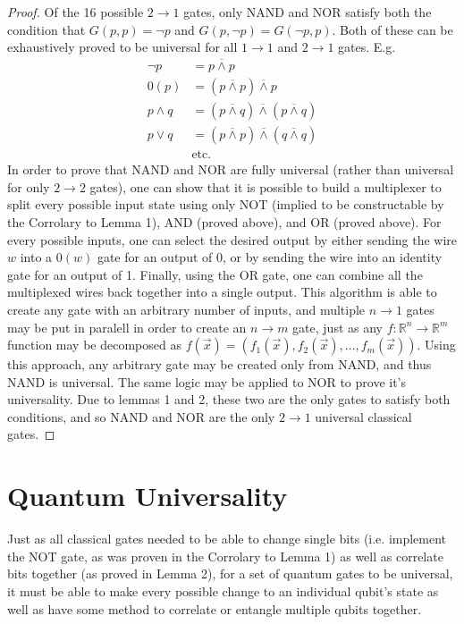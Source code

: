 \documentclass[12pt]{article}
\newcommand{\nand}{\overline{\land}}
\begin{document}
\begin{proof}
    Of the 16 possible $2 \to 1$ gates, only NAND and NOR satisfy both the condition that $G(p, p) = \neg p$ and $G(p, \neg p) = G(\neg p, p)$.
    Both of these can be exhaustively proved to be universal for all $1 \to 1$ and $2 \to 1$ gates. E.g.
    \begin{align}
        \neg p &= p \nand p \\
        0(p) &= (p \nand p) \nand p \\
        p \land q &= (p \nand q) \nand (p \nand q) \\
        p \lor q &= (p \nand p) \nand (q \nand q) \\
        &\text{etc.}
    \end{align}
    In order to prove that NAND and NOR are fully universal (rather than universal for only $2 \to 2$ gates), one can show that it is possible to build a multiplexer to split every possible input state using only NOT (implied to be constructable by the Corrolary to Lemma 1), AND (proved above), and OR (proved above). For every possible inputs, one can select the desired output by either sending the wire $w$ into a $0(w)$ gate for an output of 0, or by sending the wire into an identity gate for an output of 1. Finally, using the OR gate, one can combine all the multiplexed wires back together into a single output.
    This algorithm is able to create any gate with an arbitrary number of inputs, and multiple $n \to 1$ gates may be put in paralell in order to create an $n \to m$ gate, just as any $f: \mathbb{R}^n \to \mathbb{R}^m$ function may be decomposed as $f(\overrightarrow{x}) = (f_1(\overrightarrow{x}), f_2(\overrightarrow{x}), \dots, f_m(\overrightarrow{x}))$.
    Using this approach, any arbitrary gate may be created only from NAND, and thus NAND is universal. The same logic may be applied to NOR to prove it's universality. Due to lemmas 1 and 2, these two are the only gates to satisfy both conditions, and so NAND and NOR are the only $2 \to 1$ universal classical gates.
\end{proof}

\section{Quantum Universality}
Just as all classical gates needed to be able to change single bits (i.e. implement the NOT gate, as was proven in the Corrolary to Lemma 1) as well as correlate bits together (as proved in Lemma 2), for a set of quantum gates to be universal, it must be able to make every possible change to an individual qubit's state as well as have some method to correlate or entangle multiple qubits together.
\end{document}
